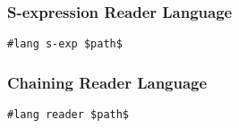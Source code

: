 \subsubsection{S-expression Reader Language}


\begin{lstlisting}
#lang s-exp $path$
\end{lstlisting}





\subsubsection{Chaining Reader Language}


\begin{lstlisting}
#lang reader $path$
\end{lstlisting}






